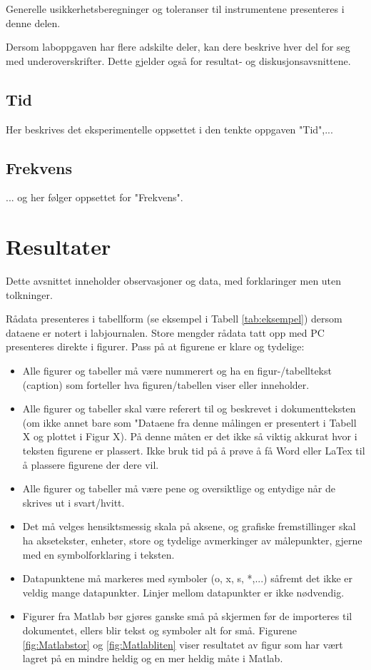 \documentclass[norsk,a4paper,12pt]{article}
\begin{document}
Generelle usikkerhetsberegninger og toleranser til instrumentene presenteres i denne delen.

Dersom laboppgaven har flere adskilte deler, kan dere beskrive hver del for seg med underoverskrifter. Dette gjelder også for resultat- og diskusjonsavsnittene.

\subsection{Tid}
Her beskrives det eksperimentelle oppsettet i den tenkte oppgaven "Tid",...
\subsection{Frekvens}
... og her følger oppsettet for "Frekvens".

\section{Resultater}
Dette avsnittet inneholder observasjoner og data, med forklaringer men uten tolkninger.

Rådata presenteres i tabellform (se eksempel i Tabell
\ref{tab:eksempel}) dersom dataene er notert i  labjournalen. Store mengder rådata tatt opp med PC presenteres direkte i figurer. Pass på at figurene er klare og tydelige:

\begin{itemize}
\item Alle figurer og tabeller må være nummerert og ha en figur-/tabelltekst (caption) som forteller hva figuren/tabellen viser eller inneholder.
\item Alle figurer og tabeller skal være referert til og beskrevet i dokumentteksten (om ikke annet bare som "Dataene fra denne målingen er presentert i Tabell X og plottet i Figur X). På denne måten er det ikke så viktig akkurat hvor i teksten figurene er plassert. Ikke bruk tid på å prøve å få Word eller LaTex til å plassere figurene der dere vil.
\item Alle figurer og tabeller må være pene og oversiktlige og
  entydige når de skrives ut i svart/hvitt.
\item Det må velges hensiktsmessig skala på aksene, og grafiske
  fremstillinger skal ha aksetekster, enheter, store og tydelige
  avmerkinger av målepunkter, gjerne med en symbolforklaring i
  teksten.
\item Datapunktene må markeres med symboler (o, x, s, *,...) såfremt det ikke er veldig mange datapunkter. Linjer mellom datapunkter er ikke nødvendig.
\item Figurer fra Matlab bør gjøres ganske små på skjermen før de importeres til dokumentet, ellers blir tekst og symboler alt for små. Figurene \ref{fig:Matlabstor} og \ref{fig:Matlabliten} viser resultatet av figur som har vært lagret på en mindre heldig og en mer heldig måte i Matlab.
\end{itemize}
\end{document}
